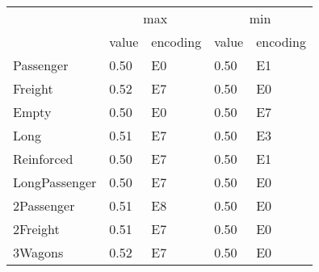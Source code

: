 \begin{tabular}{lllll}
\toprule
 & \multicolumn{2}{c}{max} & \multicolumn{2}{c}{min} \\
 & value & encoding & value & encoding \\
\midrule
Passenger & 0.50 & E0 & 0.50 & E1 \\
Freight & 0.52 & E7 & 0.50 & E0 \\
Empty & 0.50 & E0 & 0.50 & E7 \\
Long & 0.51 & E7 & 0.50 & E3 \\
Reinforced & 0.50 & E7 & 0.50 & E1 \\
LongPassenger & 0.50 & E7 & 0.50 & E0 \\
2Passenger & 0.51 & E8 & 0.50 & E0 \\
2Freight & 0.51 & E7 & 0.50 & E0 \\
3Wagons & 0.52 & E7 & 0.50 & E0 \\
\bottomrule
\end{tabular}
